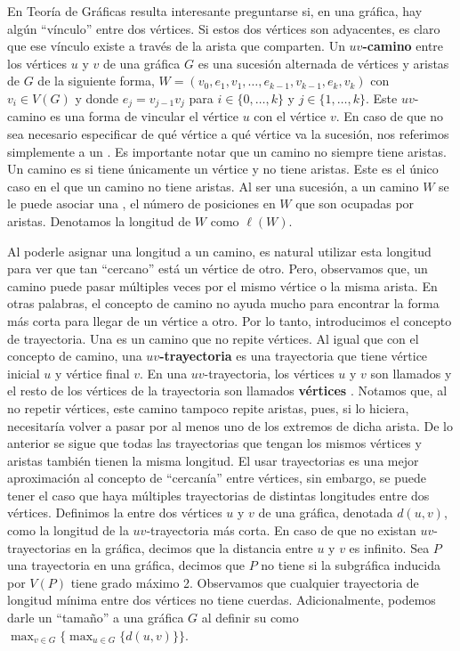En Teor\'ia de Gr\'aficas resulta interesante preguntarse si, en una gr\'afica,
hay alg\'un ``v\'inculo'' entre dos v\'ertices. Si estos dos v\'ertices son
adyacentes, es claro que ese v\'inculo existe a trav\'es de la arista que
comparten. Un $uv$\textbf{-camino} entre los v\'ertices
$u$ y $v$ de una gr\'afica $G$ es una sucesi\'on alternada de v\'ertices y
aristas de $G$ de la siguiente forma, $W=(v_0, e_1,v_1, \dots, e_{k-1},v_{k-1},
e_k,v_k)$ con $v_i \in V(G)$ y donde $e_j = v_{j-1}v_j$ para $i \in \{0, \dots,
k\}$ y $j \in \{ 1, \dots, k\}$. Este $uv$-camino es una forma de vincular el
v\'ertice $u$ con el v\'ertice $v$. En caso de que no sea necesario especificar
de qu\'e v\'ertice a qu\'e v\'ertice va la sucesi\'on, nos referimos simplemente
a un . Es importante notar que un camino no siempre tiene
aristas. Un camino es  si tiene \'unicamente un
v\'ertice y no tiene aristas. Este es el \'unico caso en el que un camino no
tiene aristas. Al ser una sucesi\'on, a un camino $W$ se le puede asociar una
, el n\'umero de posiciones en $W$ que son ocupadas
por aristas. Denotamos la longitud de $W$ como $\ell(W)$. 

Al poderle asignar una longitud a un camino, es natural utilizar esta longitud
para ver que tan ``cercano'' est\'a un v\'ertice de otro. Pero, observamos que,
un camino puede pasar m\'ultiples veces por el mismo v\'ertice o la misma
arista. En otras palabras, el concepto de camino no ayuda mucho para encontrar
la forma m\'as corta para llegar de un v\'ertice a otro. Por lo tanto,
introducimos el concepto de trayectoria. Una  es un camino
que no repite v\'ertices. Al igual que con el concepto de camino, una
$uv$\textbf{-trayectoria}  es una trayectoria que
tiene v\'ertice inicial $u$ y v\'ertice final $v$. En una $uv$-trayectoria, los
v\'ertices $u$ y $v$ son llamados  y el resto de
los v\'ertices de la trayectoria son llamados \textbf{v\'ertices}
. Notamos que, al no repetir v\'ertices, este
camino tampoco repite aristas, pues, si lo hiciera, necesitar\'ia volver a pasar
por al menos uno de los extremos de dicha arista. De lo anterior se sigue que
todas las trayectorias que tengan los mismos v\'ertices y aristas tambi\'en
tienen la misma longitud. El usar trayectorias es una mejor aproximaci\'on al
concepto de ``cercan\'ia'' entre v\'ertices, sin embargo, se puede tener el caso
que haya m\'ultiples trayectorias de distintas longitudes entre dos v\'ertices.
Definimos la  entre dos v\'ertices $u$ y $v$ de una gr\'afica,
denotada $d(u,v)$, como la longitud de la $uv$-trayectoria m\'as corta. En caso
de que no existan $uv$-trayectorias en la gr\'afica, decimos que la distancia
entre $u$ y $v$ es infinito. Sea $P$ una trayectoria en una gr\'afica, decimos
que $P$ no tiene  si la subgr\'afica inducida por $V(P)$ tiene
grado m\'aximo 2. Observamos que cualquier trayectoria de longitud m\'inima
entre dos v\'ertices no tiene cuerdas. Adicionalmente, podemos darle un
``tama\~{n}o'' a una gr\'afica $G$ al definir su  como
$\max_{v\in G}\{\max_{u\in G}\{d(u,v)\}\}$. 

